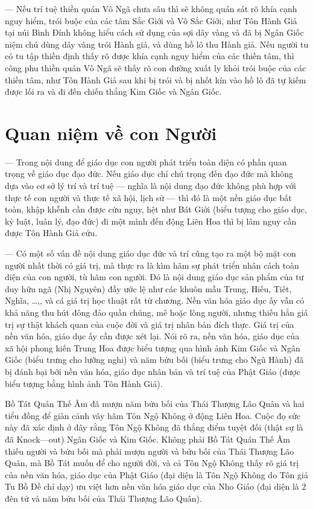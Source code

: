 — Nếu trí tuệ thiền quán Vô Ngã chưa sâu thì sẽ không quán sát rõ khía cạnh nguy hiểm, trói buộc của các tâm Sắc Giới và Vô Sắc Giới, như Tôn Hành Giả tại núi Bình Đính không hiểu cách sử dụng của sợi dây vàng và đã bị Ngân Giốc niệm chú dùng dây vàng trói Hành giả, và dùng hồ lô thu Hành giả. Nếu người tu có tu tập thiền định thấy rõ được khía cạnh nguy hiểm của các thiền tâm, thì công phu thiền quán Vô Ngã sẽ thấy rõ con đường xuất ly khỏi trói buộc của các thiền tâm, như Tôn Hành Giả sau khi bị trói và bị nhốt kín vào hồ lô đã tự kiếm được lối ra và đi đến chiến thắng Kim Giốc và Ngân Giốc.

\section{Quan niệm về con Người} %
\label{sec:33_34_con_nguoi}

— Trong nội dung để giáo dục con người phát triển toàn diện có phần quan trọng về giáo dục đạo đức. Nếu giáo dục chỉ chú trọng đến đạo đức mà không dựa vào cơ sở lý trí và trí tuệ — nghĩa là nội dung đạo đức không phù hợp với thực tế con người và thực tế xã hội, lịch sử — thì đó là một nền giáo dục bất toàn, khập khễnh cần được cứu nguy, hệt như Bát Giới (biểu tượng cho giáo dục, kỷ luật, luân lý, đạo đức) đi một mình đến động Liên Hoa thì bị lâm nguy cần được Tôn Hành Giả cứu.

— Có một số vấn đề nội dung giáo dục đức và trí cũng tạo ra một bộ mặt con người nhất thời có giá trị, mà thực ra là kìm hãm sự phát triển nhân cách toàn diện của con người, tù hãm con người. Đó là nội dung giáo dục sản phẩm của tư duy hữu ngã (Nhị Nguyên) đầy ước lệ như các khuôn mẫu Trung, Hiếu, Tiết, Nghĩa, \ldots,, và cá giá trị học thuật rất từ chương. Nền văn hóa giáo dục ấy vẫn có khả năng thu hút đông đảo quần chúng, mê hoặc lòng người, nhưng thiếu hẳn giá trị sự thật khách quan của cuộc đời và giá trị nhân bản đích thực. Giá trị của nền văn hóa, giáo dục ấy cần được xét lại. Nói rõ ra, nền văn hóa, giáo dục của xã hội phong kiến Trung Hoa được biểu tượng qua hình ảnh Kim Giốc và Ngân Giốc (biểu trưng cho lưỡng nghi) và năm bửu bối (biểu trưng cho Ngũ Hành) đã bị đánh bại bởi nền văn hóa, giáo dục nhân bản và trí tuệ của Phật Giáo (được biểu tượng bằng hình ảnh Tôn Hành Giả).

Bồ Tát Quán Thế Âm đã mượn năm bửu bối của Thái Thượng Lão Quân và hai tiểu đồng để giàn cảnh vây hãm Tôn Ngộ Không ở động Liên Hoa. Cuộc đọ sức này đã xác định ở đây rằng Tôn Ngộ Không đã thắng điểm tuyệt đối (thật sự là đã Knock—out) Ngân Giốc và Kim Giốc. Không phải Bồ Tát Quán Thế Âm thiếu người và bửu bối mà phải mượn người và bửu bối của Thái Thượng Lão Quân, mà Bồ Tát muốn để cho người đời, và cả Tôn Ngộ Không thấy rõ giá trị của nền văn hóa, giáo dục của Phật Giáo (đại diện là Tôn Ngộ Không do Tôn giả Tu Bồ Đề chỉ dạy) ưu việt hơn nền văn hóa giáo dục của Nho Giáo (đại diện là 2 đên tử và năm bửu bối của Thái Thượng Lão Quân).

